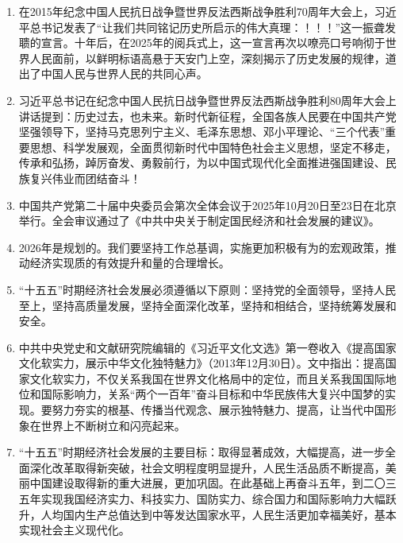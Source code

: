 \documentclass[UTF8,11pt,a4paper]{ctexart}
\begin{document}
\begin{enumerate}[label=\textbf{\arabic*.}, leftmargin=2.5em, itemsep=0.5em]
\item 在2015年纪念中国人民抗日战争暨世界反法西斯战争胜利70周年大会上，习近平总书记发表了“让我们共同铭记历史所启示的伟大真理：！！！”这一振聋发聩的宣言。十年后，在2025年的阅兵式上，这一宣言再次以嘹亮口号响彻于世界人民面前，以鲜明标语高悬于天安门上空，深刻揭示了历史发展的规律，道出了中国人民与世界人民的共同心声。
\item 习近平总书记在纪念中国人民抗日战争暨世界反法西斯战争胜利80周年大会上讲话提到：历史过去，也未来。新时代新征程，全国各族人民要在中国共产党坚强领导下，坚持马克思列宁主义、毛泽东思想、邓小平理论、“三个代表”重要思想、科学发展观，全面贯彻新时代中国特色社会主义思想，坚定不移走，传承和弘扬，踔厉奋发、勇毅前行，为以中国式现代化全面推进强国建设、民族复兴伟业而团结奋斗！
\item 中国共产党第二十届中央委员会第次全体会议于2025年10月20日至23日在北京举行。全会审议通过了《中共中央关于制定国民经济和社会发展的建议》。
\item 2026年是规划的。我们要坚持工作总基调，实施更加积极有为的宏观政策，推动经济实现质的有效提升和量的合理增长。
\item “十五五”时期经济社会发展必须遵循以下原则：坚持党的全面领导，坚持人民至上，坚持高质量发展，坚持全面深化改革，坚持和相结合，坚持统筹发展和安全。
\item 中共中央党史和文献研究院编辑的《习近平文化文选》第一卷收入《提高国家文化软实力，展示中华文化独特魅力》（2013年12月30日）。文中指出：提高国家文化软实力，不仅关系我国在世界文化格局中的定位，而且关系我国国际地位和国际影响力，关系“两个一百年”奋斗目标和中华民族伟大复兴中国梦的实现。要努力夯实的根基、传播当代观念、展示独特魅力、提高，让当代中国形象在世界上不断树立和闪亮起来。
\item “十五五”时期经济社会发展的主要目标：取得显著成效，大幅提高，进一步全面深化改革取得新突破，社会文明程度明显提升，人民生活品质不断提高，美丽中国建设取得新的重大进展，更加巩固。在此基础上再奋斗五年，到二〇三五年实现我国经济实力、科技实力、国防实力、综合国力和国际影响力大幅跃升，人均国内生产总值达到中等发达国家水平，人民生活更加幸福美好，基本实现社会主义现代化。
\end{enumerate}
\end{document}
